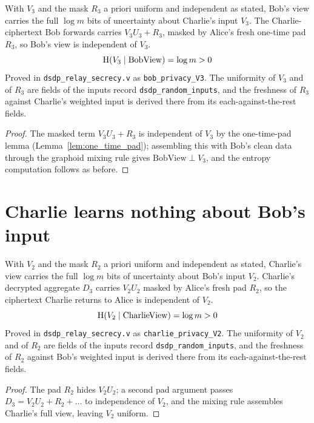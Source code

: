 \begin{theorem}
  \label{thm:bob_privacy_V3}
  \rocqok
  With $V_3$ and the mask $R_3$ a priori uniform and independent as stated, Bob's
  view carries the full $\log m$ bits of uncertainty about Charlie's input $V_3$.
  The Charlie-ciphertext Bob forwards carries $V_3 U_3 + R_3$, masked by Alice's
  fresh one-time pad $R_3$, so Bob's view is independent of $V_3$.
  \[ \mathrm{H}(V_3 \mid \mathrm{BobView}) = \log m > 0 \]
  Proved in \texttt{dsdp\_relay\_secrecy.v} as \texttt{bob\_privacy\_V3}.
  The uniformity of $V_3$ and of $R_3$ are fields of the inputs record
  \texttt{dsdp\_random\_inputs}, and the freshness of $R_3$ against Charlie's
  weighted input is derived there from its each-against-the-rest fields.
\end{theorem}
\begin{proof}
  \rocqok
  The masked term $V_3 U_3 + R_3$ is independent of $V_3$ by the one-time-pad
  lemma (Lemma~\ref{lem:one_time_pad}); assembling this with Bob's clean data
  through the graphoid mixing rule gives $\mathrm{BobView} \perp V_3$, and the
  entropy computation follows as before.
\end{proof}

\chapter{Charlie learns nothing about Bob's input}

\begin{theorem}
  \label{thm:charlie_privacy_V2}
  \rocqok
  With $V_2$ and the mask $R_2$ a priori uniform and independent as stated,
  Charlie's view carries the full $\log m$ bits of uncertainty about Bob's input
  $V_2$. Charlie's decrypted aggregate $D_3$ carries $V_2 U_2$ masked by Alice's
  fresh pad $R_2$, so the ciphertext Charlie returns to Alice is independent of
  $V_2$.
  \[ \mathrm{H}(V_2 \mid \mathrm{CharlieView}) = \log m > 0 \]
  Proved in \texttt{dsdp\_relay\_secrecy.v} as
  \texttt{charlie\_privacy\_V2}. The uniformity of $V_2$ and of $R_2$ are
  fields of the inputs record \texttt{dsdp\_random\_inputs}, and the freshness
  of $R_2$ against Bob's weighted input is derived there from its
  each-against-the-rest fields.
\end{theorem}
\begin{proof}
  \rocqok
  The pad $R_2$ hides $V_2 U_2$; a second pad argument passes $D_3 = V_2 U_2 + R_2
  + \dots$ to independence of $V_2$, and the mixing rule assembles Charlie's full
  view, leaving $V_2$ uniform.
\end{proof}

